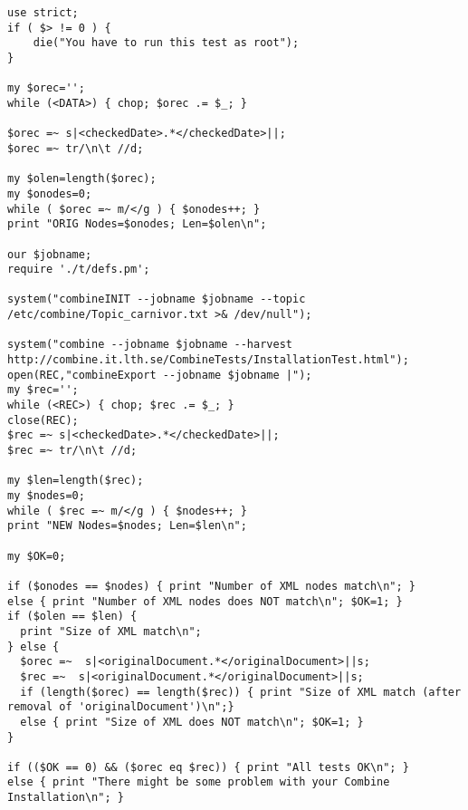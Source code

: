\begin{verbatim}
use strict;
if ( $> != 0 ) {
    die("You have to run this test as root");
}

my $orec='';
while (<DATA>) { chop; $orec .= $_; }

$orec =~ s|<checkedDate>.*</checkedDate>||;
$orec =~ tr/\n\t //d;

my $olen=length($orec);
my $onodes=0;
while ( $orec =~ m/</g ) { $onodes++; }
print "ORIG Nodes=$onodes; Len=$olen\n";

our $jobname;
require './t/defs.pm';

system("combineINIT --jobname $jobname --topic /etc/combine/Topic_carnivor.txt >& /dev/null");

system("combine --jobname $jobname --harvest http://combine.it.lth.se/CombineTests/InstallationTest.html");
open(REC,"combineExport --jobname $jobname |");
my $rec='';
while (<REC>) { chop; $rec .= $_; }
close(REC);
$rec =~ s|<checkedDate>.*</checkedDate>||;
$rec =~ tr/\n\t //d;

my $len=length($rec);
my $nodes=0;
while ( $rec =~ m/</g ) { $nodes++; }
print "NEW Nodes=$nodes; Len=$len\n";

my $OK=0;

if ($onodes == $nodes) { print "Number of XML nodes match\n"; }
else { print "Number of XML nodes does NOT match\n"; $OK=1; }
if ($olen == $len) {
  print "Size of XML match\n";
} else {
  $orec =~  s|<originalDocument.*</originalDocument>||s;
  $rec =~  s|<originalDocument.*</originalDocument>||s;
  if (length($orec) == length($rec)) { print "Size of XML match (after removal of 'originalDocument')\n";}
  else { print "Size of XML does NOT match\n"; $OK=1; }
}

if (($OK == 0) && ($orec eq $rec)) { print "All tests OK\n"; }
else { print "There might be some problem with your Combine Installation\n"; }


\end{verbatim}
